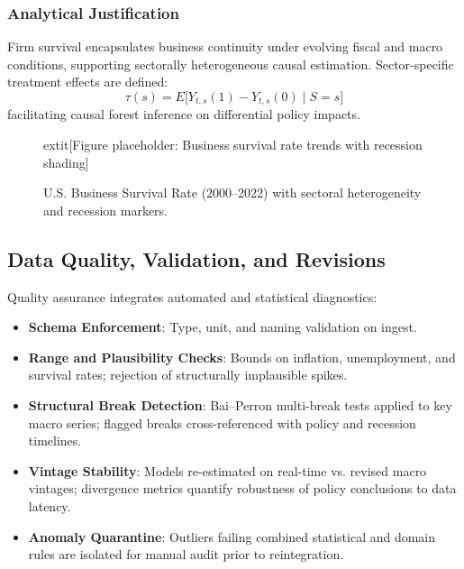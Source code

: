 \subsubsection{Analytical Justification}\label{subsubsec:firm_justification}
Firm survival encapsulates business continuity under evolving fiscal and macro conditions, supporting sectorally heterogeneous causal estimation. Sector-specific treatment effects are defined:
\begin{equation}
  \tau(s) = E\big[ Y_{t,s}(1) - Y_{t,s}(0) \mid S = s \big]
\end{equation}
facilitating causal forest inference on differential policy impacts.

\begin{figure}[htbp]
  \centering
  	extit{[Figure placeholder: Business survival rate trends with recession shading]}
  \caption{U.S. Business Survival Rate (2000--2022) with sectoral heterogeneity and recession markers.}\label{fig:survival_trends}
\end{figure}

\subsection{Data Quality, Validation, and Revisions}\label{subsec:data_quality}
Quality assurance integrates automated and statistical diagnostics:
\begin{itemize}
  \item \textbf{Schema Enforcement}: Type, unit, and naming validation on ingest.
  \item \textbf{Range and Plausibility Checks}: Bounds on inflation, unemployment, and survival rates; rejection of structurally implausible spikes.
  \item \textbf{Structural Break Detection}: Bai--Perron multi-break tests applied to key macro series; flagged breaks cross-referenced with policy and recession timelines.
  \item \textbf{Vintage Stability}: Models re-estimated on real-time vs. revised macro vintages; divergence metrics quantify robustness of policy conclusions to data latency.
  \item \textbf{Anomaly Quarantine}: Outliers failing combined statistical and domain rules are isolated for manual audit prior to reintegration.
\end{itemize}

